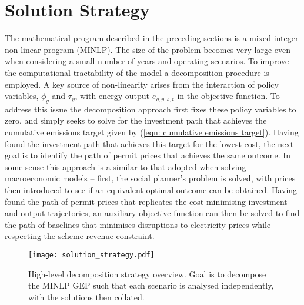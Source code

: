 \documentclass{article}
\newcommand{\sGeneratorsExistingThermal}{G^{\mathrm{E,T}}}
\newcommand{\sGeneratorsCandidate}{G^{\mathrm{C}}}
\newcommand{\sYears}{Y}
\newcommand{\sScenarios}{S}
\newcommand{\sIntervals}{T}
\newcommand{\iGenerator}{g}
\newcommand{\iYear}{y}
\newcommand{\iScenario}{s}
\newcommand{\iInterval}{t}
\newcommand{\cScenarioDuration}[1][\iYear,\iScenario]{\rho_{#1}}
\newcommand{\cEmissionsIntensity}[1][\iGenerator]{E_{#1}}
\newcommand{\cSchemeRevenueCumulativeTarget}{\overline{R}}
\newcommand{\vBaseline}[1][\iYear]{\phi_{#1}}
\newcommand{\vPermitPrice}[1][\iYear]{\tau_{#1}}
\newcommand{\vEnergy}[1][\iGenerator,\iYear,\iScenario,\iInterval]{e_{#1}}
\begin{document}
%


\section{Solution Strategy}
The mathematical program described in the preceding sections is a mixed integer non-linear program (MINLP). The size of the problem becomes very large even when considering a small number of years and operating scenarios. To improve the computational tractability of the model a decomposition procedure is employed. A key source of non-linearity arises from the interaction of policy variables, $\vBaseline$ and $\vPermitPrice$, with energy output $\vEnergy$ in the objective function. To address this issue the decomposition approach first fixes these policy variables to zero, and simply seeks to solve for the investment path that achieves the cumulative emissions target given by (\ref{eqn: cumulative emissions target}). Having found the investment path that achieves this target for the lowest cost, the next goal is to identify the path of permit prices that achieves the same outcome. In some sense this approach is a similar to that adopted when solving macroeconomic models -- first, the social planner's problem is solved, with prices then introduced to see if an equivalent optimal outcome can be obtained. Having found the path of permit prices that replicates the cost minimising investment and output trajectories, an auxiliary objective function can then be solved to find the path of baselines that minimises disruptions to electricity prices while respecting the scheme revenue constraint.

\begin{figure}
	\texttt{[image: solution\_strategy.pdf]}
	\caption{High-level decomposition strategy overview. Goal is to decompose the MINLP GEP such that each scenario is analysed independently, with the solutions then collated.}
\end{figure}
\end{document}
